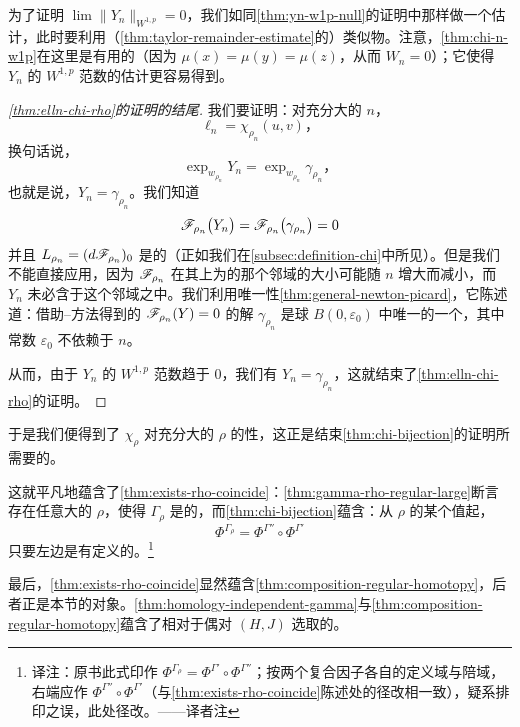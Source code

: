 为了证明 $\lim\bigl\|Y_{n}\bigr\|_{W^{1,p}}=0$，我们如同\cref{thm:yn-w1p-null}的证明中那样做一个估计，此时要利用（\cref{thm:taylor-remainder-estimate}的）类似物。注意，\cref{thm:chi-n-w1p}在这里是有用的（因为 $\mu(x)=\mu(y)=\mu(z)$，从而 $W_{n}=0$）；它使得 $Y_{n}$ 的 $W^{1,p}$ 范数的估计更容易得到。\noqed

\begin{proof}[\cref{thm:elln-chi-rho}的证明的结尾]
我们要证明：对充分大的 $n$，
\[
\ell_{n}=\chi_{\rho_{n}}(u,v)\text{，}
\]
换句话说，
\[
\exp_{w_{\rho_{n}}}Y_{n}=\exp_{w_{\rho_{n}}}\gamma_{\rho_{n}}\text{，}
\]
也就是说，$Y_{n}=\gamma_{\rho_{n}}$。我们知道
\[
\mathscr{F}_{\rho_{n}}\bigl(Y_{n}\bigr)=\mathscr{F}_{\rho_{n}}\bigl(\gamma_{\rho_{n}}\bigr)=0
\]
并且 $L_{\rho_{n}}=(d\mathscr{F}_{\rho_{n}})_{0}$ 是\trBijective{}的（正如我们在\cref{subsec:definition-chi}中所见）。但是我们不能直接应用\trLocalInversionTheorem，因为 $\mathscr{F}_{\rho_{n}}$ 在其上为\trBijective{}的那个邻域的大小可能随 $n$ 增大而减小，而 $Y_{n}$ 未必含于这个邻域之中。我们利用唯一性\cref{thm:general-newton-picard}，它陈述道：借助\trNewton--\trPicard{}方法得到的 $\mathscr{F}_{\rho_{n}}(Y)=0$ 的解 $\gamma_{\rho_{n}}$ 是球 $B(0,\varepsilon_{0})$ 中唯一的一个，其中常数 $\varepsilon_{0}$ 不依赖于 $n$。

从而，由于 $Y_{n}$ 的 $W^{1,p}$ 范数趋于 $0$，我们有 $Y_{n}=\gamma_{\rho_{n}}$，这就结束了\cref{thm:elln-chi-rho}的证明。
\end{proof}

于是我们便得到了 $\chi_{\rho}$ 对充分大的 $\rho$ 的\trSurjective{}性，这正是结束\cref{thm:chi-bijection}的证明所需要的。\noqed

这就平凡地蕴含了\cref{thm:exists-rho-coincide}：\cref{thm:gamma-rho-regular-large}断言存在任意大的 $\rho$，使得 $\Gamma_{\rho}$ 是\trRegular{}的，而\cref{thm:chi-bijection}蕴含：从 $\rho$ 的某个值起，
\[
\Phi^{\Gamma_{\rho}}=\Phi^{\Gamma''}\circ\Phi^{\Gamma'}
\]
只要左边是有定义的。\footnote{译注：原书此式印作 $\Phi^{\Gamma_{\rho}}=\Phi^{\Gamma'}\circ\Phi^{\Gamma''}$；按两个复合因子各自的定义域与陪域，右端应作 $\Phi^{\Gamma''}\circ\Phi^{\Gamma'}$（与\cref{thm:exists-rho-coincide}陈述处的径改相一致），疑系排印之误，此处径改。——译者注}

最后，\cref{thm:exists-rho-coincide}显然蕴含\cref{thm:composition-regular-homotopy}，后者正是本节的对象。\cref{thm:homology-independent-gamma}与\cref{thm:composition-regular-homotopy}蕴含了\trFloerHomology{}相对于\trRegular{}偶对 $(H,J)$ 选取的\trInvariance。
